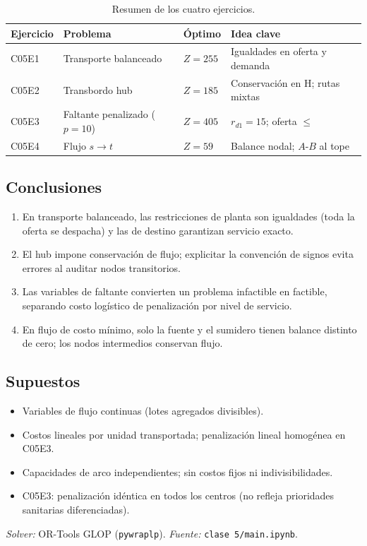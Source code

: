 \documentclass[11pt,a4paper]{article}
\begin{document}
\begin{table}[H]
\centering
\small
\caption{Resumen de los cuatro ejercicios.}
\label{tab:sint}
\begin{tabularx}{\textwidth}{@{}lXXX@{}}
\toprule
Ejercicio & Problema & Óptimo & Idea clave \\
\midrule
C05E1 & Transporte balanceado & $Z=255$ & Igualdades en oferta y demanda \\
C05E2 & Transbordo hub & $Z=185$ & Conservación en H; rutas mixtas \\
C05E3 & Faltante penalizado ($p=10$) & $Z=405$ & $r_{d1}=15$; oferta $\le$ \\
C05E4 & Flujo $s\to t$ & $Z=59$ & Balance nodal; $A$-$B$ al tope \\
\bottomrule
\end{tabularx}
\end{table}

\subsection*{Conclusiones}
\begin{enumerate}
\item En transporte balanceado, las restricciones de planta son igualdades (toda la oferta se despacha) y las de destino garantizan servicio exacto.
\item El hub impone conservación de flujo; explicitar la convención de signos evita errores al auditar nodos transitorios.
\item Las variables de faltante convierten un problema infactible en factible, separando costo logístico de penalización por nivel de servicio.
\item En flujo de costo mínimo, solo la fuente y el sumidero tienen balance distinto de cero; los nodos intermedios conservan flujo.
\end{enumerate}

\subsection*{Supuestos}
\begin{itemize}
\item Variables de flujo continuas (lotes agregados divisibles).
\item Costos lineales por unidad transportada; penalización lineal homogénea en C05E3.
\item Capacidades de arco independientes; sin costos fijos ni indivisibilidades.
\item C05E3: penalización idéntica en todos los centros (no refleja prioridades sanitarias diferenciadas).
\end{itemize}

\vspace{0.5em}
\noindent\small\textit{Solver:} OR-Tools GLOP (\texttt{pywraplp}). \textit{Fuente:} \texttt{clase 5/main.ipynb}.
\end{document}
